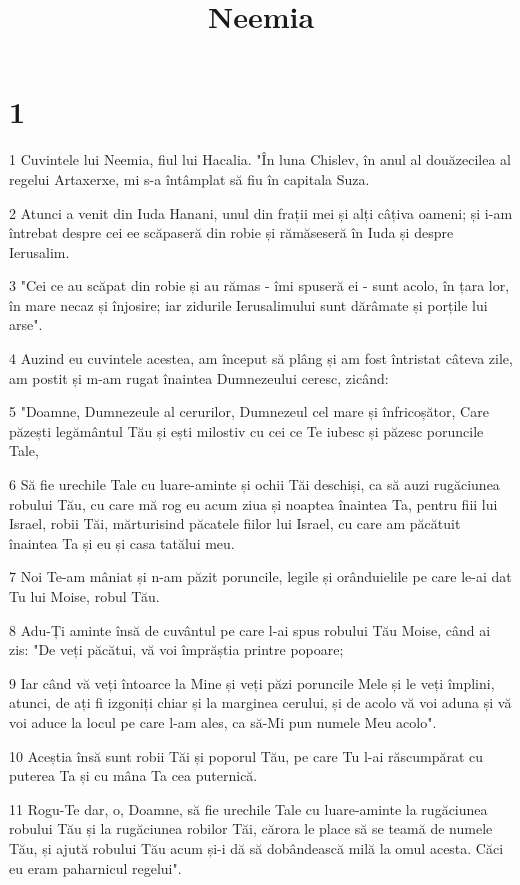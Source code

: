 

\title{Neemia}


\chapter{1}

\par 1 Cuvintele lui Neemia, fiul lui Hacalia. "În luna Chislev, în anul al douăzecilea al regelui Artaxerxe, mi s-a întâmplat să fiu în capitala Suza.
\par 2 Atunci a venit din Iuda Hanani, unul din frații mei și alți câțiva oameni; și i-am întrebat despre cei ee scăpaseră din robie și rămăseseră în Iuda și despre Ierusalim.
\par 3 "Cei ce au scăpat din robie și au rămas - îmi spuseră ei - sunt acolo, în țara lor, în mare necaz și înjosire; iar zidurile Ierusalimului sunt dărâmate și porțile lui arse".
\par 4 Auzind eu cuvintele acestea, am început să plâng și am fost întristat câteva zile, am postit și m-am rugat înaintea Dumnezeului ceresc, zicând:
\par 5 "Doamne, Dumnezeule al cerurilor, Dumnezeul cel mare și înfricoșător, Care păzești legământul Tău și ești milostiv cu cei ce Te iubesc și păzesc poruncile Tale,
\par 6 Să fie urechile Tale cu luare-aminte și ochii Tăi deschiși, ca să auzi rugăciunea robului Tău, cu care mă rog eu acum ziua și noaptea înaintea Ta, pentru fiii lui Israel, robii Tăi, mărturisind păcatele fiilor lui Israel, cu care am păcătuit înaintea Ta și eu și casa tatălui meu.
\par 7 Noi Te-am mâniat și n-am păzit poruncile, legile și orânduielile pe care le-ai dat Tu lui Moise, robul Tău.
\par 8 Adu-Ți aminte însă de cuvântul pe care l-ai spus robului Tău Moise, când ai zis: "De veți păcătui, vă voi împrăștia printre popoare;
\par 9 Iar când vă veți întoarce la Mine și veți păzi poruncile Mele și le veți împlini, atunci, de ați fi izgoniți chiar și la marginea cerului, și de acolo vă voi aduna și vă voi aduce la locul pe care l-am ales, ca să-Mi pun numele Meu acolo".
\par 10 Aceștia însă sunt robii Tăi și poporul Tău, pe care Tu l-ai răscumpărat cu puterea Ta și cu mâna Ta cea puternică.
\par 11 Rogu-Te dar, o, Doamne, să fie urechile Tale cu luare-aminte la rugăciunea robului Tău și la rugăciunea robilor Tăi, cărora le place să se teamă de numele Tău, și ajută robului Tău acum și-i dă să dobândească milă la omul acesta. Căci eu eram paharnicul regelui".

